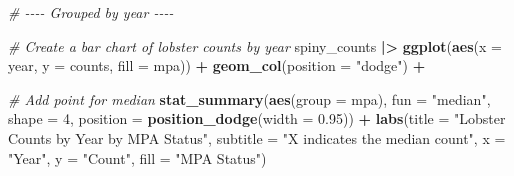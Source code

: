 \documentclass[
]{article}
\newenvironment{Shaded}{\begin{snugshade}}{\end{snugshade}}
\newcommand{\AttributeTok}[1]{\textcolor[rgb]{0.13,0.29,0.53}{#1}}
\newcommand{\CommentTok}[1]{\textcolor[rgb]{0.56,0.35,0.01}{\textit{#1}}}
\newcommand{\DecValTok}[1]{\textcolor[rgb]{0.00,0.00,0.81}{#1}}
\newcommand{\FloatTok}[1]{\textcolor[rgb]{0.00,0.00,0.81}{#1}}
\newcommand{\FunctionTok}[1]{\textcolor[rgb]{0.13,0.29,0.53}{\textbf{#1}}}
\newcommand{\NormalTok}[1]{#1}
\newcommand{\SpecialCharTok}[1]{\textcolor[rgb]{0.81,0.36,0.00}{\textbf{#1}}}
\newcommand{\StringTok}[1]{\textcolor[rgb]{0.31,0.60,0.02}{#1}}
\begin{document}
\begin{Shaded}
\begin{Highlighting}[]
\CommentTok{\# {-}{-}{-}{-} Grouped by year {-}{-}{-}{-}}

\CommentTok{\# Create a bar chart of lobster counts by year}
\NormalTok{spiny\_counts }\SpecialCharTok{|\textgreater{}}
\FunctionTok{ggplot}\NormalTok{(}\FunctionTok{aes}\NormalTok{(}\AttributeTok{x =}\NormalTok{ year, }\AttributeTok{y =}\NormalTok{ counts, }\AttributeTok{fill =}\NormalTok{ mpa)) }\SpecialCharTok{+} 
    \FunctionTok{geom\_col}\NormalTok{(}\AttributeTok{position =} \StringTok{"dodge"}\NormalTok{) }\SpecialCharTok{+}
    
    \CommentTok{\# Add point for median}
    \FunctionTok{stat\_summary}\NormalTok{(}\FunctionTok{aes}\NormalTok{(}\AttributeTok{group =}\NormalTok{ mpa),}
                 \AttributeTok{fun =} \StringTok{"median"}\NormalTok{,}
                 \AttributeTok{shape =} \DecValTok{4}\NormalTok{,}
                 \AttributeTok{position =} \FunctionTok{position\_dodge}\NormalTok{(}\AttributeTok{width =} \FloatTok{0.95}\NormalTok{)) }\SpecialCharTok{+}
    \FunctionTok{labs}\NormalTok{(}\AttributeTok{title =} \StringTok{"Lobster Counts by Year by MPA Status"}\NormalTok{,}
         \AttributeTok{subtitle =} \StringTok{"X indicates the median count"}\NormalTok{,}
         \AttributeTok{x =} \StringTok{"Year"}\NormalTok{,}
         \AttributeTok{y =} \StringTok{"Count"}\NormalTok{,}
         \AttributeTok{fill =} \StringTok{"MPA Status"}\NormalTok{) }
\end{Highlighting}
\end{Shaded}
\end{document}
